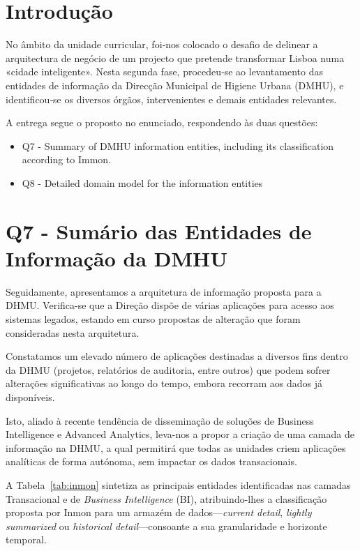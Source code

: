 \documentclass[12pt,a4paper,final]{article}
\begin{document}
    \section*{Introdução}\label{sec:introducao}
    No âmbito da unidade curricular, foi‑nos colocado o desafio de delinear a arquitectura de negócio de um projecto que pretende transformar Lisboa numa «cidade inteligente».
    Nesta segunda fase, procedeu‑se ao levantamento das entidades de informação da Direcção Municipal de Higiene
    Urbana (DMHU), e identificou‑se os diversos órgãos, intervenientes e demais entidades relevantes.

A entrega segue o proposto no enunciado, respondendo às duas questões:
    \begin{itemize}
        \item Q7 - Summary of DMHU information entities, including its classification according to Immon.
        \item Q8 - Detailed domain model for the information entities
    \end{itemize}



    \section*{Q7 - Sumário das Entidades de Informação da DMHU}

    Seguidamente, apresentamos a arquitetura de informação proposta para a DHMU. Verifica-se que a Direção dispõe
    de várias aplicações para acesso aos sistemas legados, estando em curso propostas de alteração que foram consideradas nesta arquitetura.

    Constatamos um elevado número de aplicações destinadas a diversos fins dentro da DHMU (projetos, relatórios de auditoria, entre outros) que podem sofrer alterações significativas ao longo do tempo, embora recorram aos dados já disponíveis.

    Isto, aliado à recente tendência de disseminação de soluções de Business Intelligence e Advanced Analytics,
    leva-nos a propor a criação de uma camada de informação na DHMU, a qual permitirá que todas as unidades criem
    aplicações analíticas de forma autónoma, sem impactar os dados transacionais.

    A Tabela~\ref{tab:inmon} sintetiza as principais entidades identificadas nas
    camadas Transacional e de \textit{Business Intelligence} (BI), atribuindo-lhes a
    classificação proposta por Inmon para um armazém de dados—\emph{current
    detail}, \emph{lightly summarized} ou \emph{historical detail}—consoante a sua
    granularidade e horizonte temporal.
\end{document}

